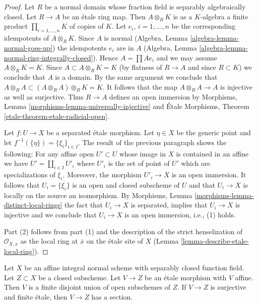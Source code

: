 \begin{proof}
Let $R$ be a normal domain whose fraction field is separably algebraically
closed. Let $R \to A$ be an \'etale ring map. Then
$A \otimes_R K$ is as a $K$-algebra a finite product
$\prod_{i = 1, \ldots, n} K$ of copies of $K$. Let $e_i$, $i = 1, \ldots, n$
be the corresponding idempotents of $A \otimes_R K$. Since $A$ is normal
(Algebra, Lemma \ref{algebra-lemma-normal-goes-up})
the idempotents $e_i$ are in $A$
(Algebra, Lemma \ref{algebra-lemma-normal-ring-integrally-closed}).
Hence $A = \prod Ae_i$ and we may assume $A \otimes_R K = K$.
Since $A \subset A \otimes_R K = K$ (by flatness of $R \to A$ and
since $R \subset K$) we conclude that $A$ is a domain.
By the same argument we conclude that
$A \otimes_R A \subset (A \otimes_R A) \otimes_R K = K$.
It follows that the map $A \otimes_R A \to A$ is
injective as well as surjective. Thus $R \to A$ defines an
open immersion by
Morphisms, Lemma \ref{morphisms-lemma-universally-injective}
and
\'Etale Morphisms, Theorem \ref{etale-theorem-etale-radicial-open}.

\medskip\noindent
Let $f : U \to X$ be a separated \'etale morphism. Let $\eta \in X$
be the generic point and let $f^{-1}(\{\eta\}) = \{\xi_i\}_{i \in I}$.
The result of the previous paragraph shows the following:
For any affine open $U' \subset U$ whose image in $X$ is contained in
an affine we have $U' = \coprod_{i \in I} U'_i$ where $U'_i$
is the set of point of $U'$ which are specializations of $\xi_i$.
Moreover, the morphism $U'_i \to X$ is an open immersion.
It follows that $U_i = \overline{\{\xi_i\}}$ is an open and closed
subscheme of $U$ and that $U_i \to X$ is locally on the source
an isomorphism. By Morphisms,
Lemma \ref{morphisms-lemma-distinct-local-rings}
the fact that $U_i \to X$ is separated, implies that
$U_i \to X$ is injective and we conclude that $U_i \to X$
is an open immersion, i.e., (1) holds.

\medskip\noindent
Part (2) follows from part (1) and the description of the strict
henselization of $\mathcal{O}_{X, x}$ as the local ring at $\overline{x}$
on the \'etale site of $X$ (Lemma \ref{lemma-describe-etale-local-ring}).
\end{proof}

\begin{lemma}
\label{lemma-closed-of-affine-normal-scheme-with-alg-closed-function-field}
Let $X$ be an affine integral normal scheme with separably closed
function field. Let $Z \subset X$ be a closed subscheme. Let
$V \to Z$ be an \'etale morphism with $V$ affine. Then $V$ is a finite
disjoint union of open subschemes of $Z$. If $V \to Z$ is
surjective and finite \'etale, then $V \to Z$ has a section.
\end{lemma}

